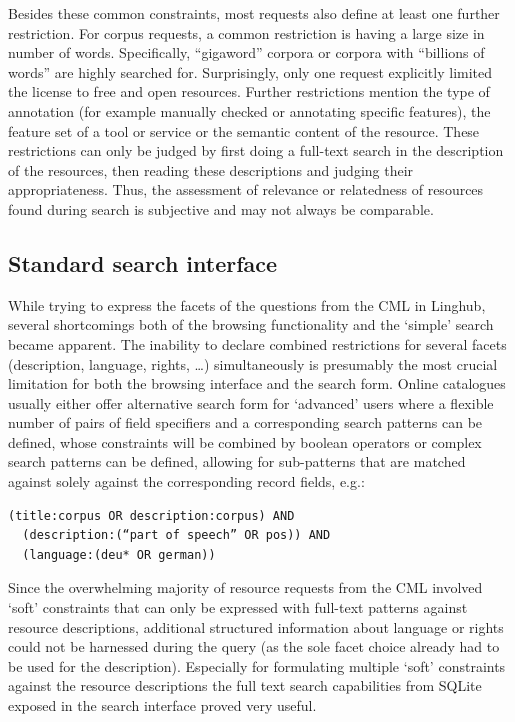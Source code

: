 \documentclass[smallextended]{svjour3}       %
\begin{document}
Besides these common constraints, most requests also define at least one further
restriction. For corpus requests, a common restriction is having a large size in
number of words. Specifically, “gigaword” corpora or corpora with “billions of
words” are highly searched for. Surprisingly, only one request explicitly
limited the license to free and open resources. Further restrictions mention the
type of annotation (for example manually checked or annotating specific
features), the feature set of a tool or service or the semantic content of the
resource. These restrictions can only be judged by first doing a full-text
search in the description of the resources, then reading these descriptions and
judging their appropriateness. Thus, the assessment of relevance or relatedness
of resources found during search is subjective and may not always be comparable.


\subsection{Standard search interface}

While trying to express the facets of the questions from the CML in Linghub,
several shortcomings both of the browsing functionality and the `simple' search
became apparent. 
The inability to declare combined restrictions for several facets (description,
language, rights, \ldots) simultaneously is presumably the most crucial limitation
for both the browsing interface and the search form. Online catalogues usually
either offer alternative search form for `advanced' users where a flexible
number of pairs of field specifiers and a corresponding search patterns can be
defined, whose constraints will be combined by boolean operators or complex
search patterns can be defined, allowing for sub-patterns that are matched
against solely against the corresponding record fields, e.g.:

\begin{verbatim}
(title:corpus OR description:corpus) AND 
  (description:(“part of speech” OR pos)) AND 
  (language:(deu* OR german))
\end{verbatim}

Since the overwhelming majority of resource requests from the CML involved ‘soft’
constraints that can only be expressed with full-text patterns against resource
descriptions, additional structured information about language or rights could
not be harnessed during the query (as the sole facet choice already had to be
used for the description). Especially for formulating multiple ‘soft’
constraints against the resource descriptions the full text search capabilities
from SQLite exposed in the search interface proved very useful. 
\end{document}
